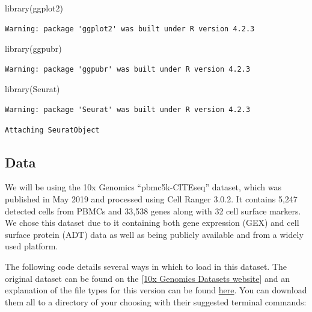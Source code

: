 \documentclass[
  letterpaper,
  DIV=11,
  numbers=noendperiod]{scrartcl}
\newenvironment{Shaded}{\begin{snugshade}}{\end{snugshade}}
\newcommand{\FunctionTok}[1]{\textcolor[rgb]{0.28,0.35,0.67}{#1}}
\newcommand{\NormalTok}[1]{\textcolor[rgb]{0.00,0.23,0.31}{#1}}
\begin{document}
\begin{Shaded}
\begin{Highlighting}[]
\FunctionTok{library}\NormalTok{(ggplot2)}
\end{Highlighting}
\end{Shaded}

\begin{verbatim}
Warning: package 'ggplot2' was built under R version 4.2.3
\end{verbatim}

\begin{Shaded}
\begin{Highlighting}[]
\FunctionTok{library}\NormalTok{(ggpubr)}
\end{Highlighting}
\end{Shaded}

\begin{verbatim}
Warning: package 'ggpubr' was built under R version 4.2.3
\end{verbatim}

\begin{Shaded}
\begin{Highlighting}[]
\FunctionTok{library}\NormalTok{(Seurat)}
\end{Highlighting}
\end{Shaded}

\begin{verbatim}
Warning: package 'Seurat' was built under R version 4.2.3
\end{verbatim}

\begin{verbatim}
Attaching SeuratObject
\end{verbatim}

\hypertarget{data}{%
\subsection{Data}\label{data}}

We will be using the 10x Genomics ``pbmc5k-CITEseq'' dataset, which was
published in May 2019 and processed using Cell Ranger 3.0.2. It contains
5,247 detected cells from PBMCs and 33,538 genes along with 32 cell
surface markers. We chose this dataset due to it containing both gene
expression (GEX) and cell surface protein (ADT) data as well as being
publicly available and from a widely used platform.

The following code details several ways in which to load in this
dataset. The original dataset can be found on the
{[}\href{https://support.10xgenomics.com/single-cell-gene-expression/datasets/3.0.2/5k_pbmc_protein_v3}{10x
Genomics Datasets website}{]} and an explanation of the file types for
this version can be found
\href{https://support.10xgenomics.com/single-cell-gene-expression/software/pipelines/3.0/output/overview}{here}.
You can download them all to a directory of your choosing with their
suggested terminal commands:
\end{document}
